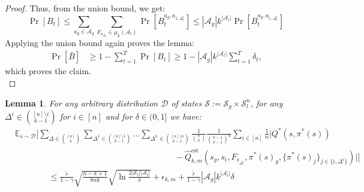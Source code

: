 \documentclass{article}
\theoremstyle{plain}
\newtheorem{lemma}[theorem]{Lemma}
\theoremstyle{definition}
\def\est{\mathrm{est}}
\begin{document}
\begin{proof}
Thus, from the union bound, we get:
\[\Pr[B_t] \leq \sum_{a_g\in\mathcal{A}_g}\sum_{F_{a_{\Delta_t}}\in \mu_k(\mathcal{A}_l)}\Pr[B_t^{a_g,a_{1,\Delta_t^1}}] \leq |\mathcal{A}_g|k^{|\mathcal{A}_l|} \Pr[B_t^{a_g,a_{1,\Delta_t^1}}]\]
Applying the union bound again proves the lemma:
\begin{align*}
    \Pr[\bar{B}] &\geq 1 - \sum_{t=1}^T \Pr[B_t] \geq 1 - |\mathcal{A}_g|k^{|\mathcal{A}_l|}\sum_{t=1}^T \delta_t,
\end{align*}
which proves the claim.\qedhere\\
\end{proof}

\begin{lemma}\label{lemma: expected_q*bound_with_different_actions}
For any arbitrary distribution $\mathcal{D}$ of states $\mathcal{S} := \mathcal{S}_g\times\mathcal{S}_l^n$, for any $\Delta^i\in{[n]\setminus i \choose k-1}$ for $i\in[n]$ and for $\delta\in (0,1]$ we have:
\begin{align*}
&\mathbb{E}_{s\sim \mathcal{D}}\bigg[\sum_{\Delta\in {[n]\choose k}}\sum_{\Delta^1 \in {[n]\setminus 1 \choose k-1}}\dots\sum_{\Delta^n \in {[n]\setminus n \choose k-1}}\frac{1}{{n\choose k}}\frac{1}{{n-1 \choose k-1}^n}\sum_{i\in[n]}\frac{1}{n}\bigg|Q^*(s, \pi^*(s)) \\
&\quad\quad\quad\quad\quad\quad\quad\quad\quad\quad\quad\quad\quad\quad\quad\quad\quad\quad\quad - \hat{Q}^\est_{k,m}(s_g, s_{i}, F_{s_{\Delta^i}}, \pi^*(s)_g, \{\pi^*(s)_j\}_{j\in\{i,\Delta^i\}})\bigg|\bigg]\\
&\quad\quad\quad\quad\leq \frac{\tilde{r}}{1-\gamma}\sqrt{\frac{n-k+1}{8nk}} \sqrt{\ln\frac{2|\mathcal{S}_l||\mathcal{A}_l|}{\delta}}  +\epsilon_{k,m} + \frac{\tilde{r}}{1-\gamma}|\mathcal{A}_g|k^{|\mathcal{A}_l|}\delta
\end{align*}
\end{lemma}
\end{document}
